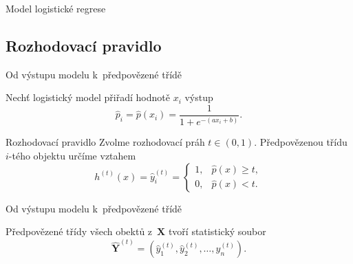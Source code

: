 \documentclass[11pt,professionalfont,aspectratio=43]{beamer}
\begin{document}
\begin{frame}{Model logistické regrese}



\end{frame}

\subsection{Rozhodovací pravidlo}

\begin{frame}{Od výstupu modelu k~předpovězené třídě}

    Nechť logistický model přiřadí hodnotě \(x_i\) výstup
    \[
        \hat p_i
        =
        \hat p(x_i)
        =
        \frac{1}{1+e^{-(ax_i+b)}}.
    \]

    \begin{tnoticebox*}{Rozhodovací pravidlo}
        Zvolme rozhodovací práh $t\in(0,1)$. Předpovězenou třídu \(i\)-tého objektu určíme vztahem
        \[
            h^{(t)}(x)
            =
            \hat y_i^{(t)}
            =
            \begin{cases}
                1, & \hat p(x)\geqslant t,\\[1mm]
                0, & \hat p(x)<t.
            \end{cases}
        \]
    \end{tnoticebox*}

\end{frame}

\begin{frame}{Od výstupu modelu k~předpovězené třídě}

    Předpovězené třídy všech obektů z~$\mathbf{X}$ tvoří statistický soubor
    \[
        \hat{\mathbf{Y}}^{(t)}
        =
        (\hat y_1^{(t)},\hat y_2^{(t)},\ldots,\hat y_n^{(t)}).
    \]

\end{frame}
\end{document}
